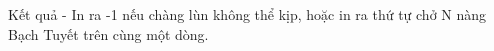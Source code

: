 Kết quả  
- In ra -1 nếu chàng lùn không thể kịp, hoặc in ra thứ tự chở N nàng Bạch Tuyết trên cùng một dòng.